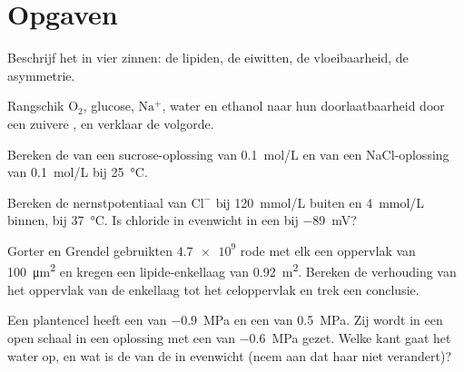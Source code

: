 \section{Opgaven}

\begin{exercise}[$\star$]\label{exo:b1:membranes-transport:1}
Beschrijf het  in vier zinnen: de lipiden, de eiwitten, de
vloeibaarheid, de asymmetrie.
\end{exercise}

\begin{exercise}[$\star$]\label{exo:b1:membranes-transport:2}
Rangschik $\mathrm{O_2}$, glucose, $\mathrm{Na^+}$, water en ethanol naar hun
doorlaatbaarheid door een zuivere , en verklaar de volgorde.
\end{exercise}

\begin{exercise}[$\star$]\label{exo:b1:membranes-transport:3}
Bereken de  van een sucrose-oplossing van \qty{0.1}{mol/L} en
van een NaCl-oplossing van \qty{0.1}{mol/L} bij \qty{25}{\celsius}.
\end{exercise}

\begin{exercise}[$\star$]\label{exo:b1:membranes-transport:4}
Bereken de nernstpotentiaal van $\mathrm{Cl^-}$ bij \qty{120}{mmol/L} buiten en
\qty{4}{mmol/L} binnen, bij \qty{37}{\celsius}. Is chloride in evenwicht in een
 bij \qty{-89}{mV}?
\end{exercise}

\begin{exercise}[$\star\star$]\label{exo:b1:membranes-transport:5}
Gorter en Grendel gebruikten $\num{4.7e9}$ rode  met elk een oppervlak van
\qty{100}{\micro m^2} en kregen een lipide-enkellaag van \qty{0.92}{m^2}. Bereken
de verhouding van het oppervlak van de enkellaag tot het celoppervlak en trek een
conclusie.
\end{exercise}

\begin{exercise}[$\star\star$]\label{exo:b1:membranes-transport:6}
Een plantencel heeft een  van \qty{-0.9}{MPa} en een
 van \qty{0.5}{MPa}. Zij wordt in een open schaal in een oplossing
met een  van \qty{-0.6}{MPa} gezet. Welke kant gaat het water
op, en wat is de  van de  in evenwicht (neem aan dat haar
 niet verandert)?
\end{exercise}

